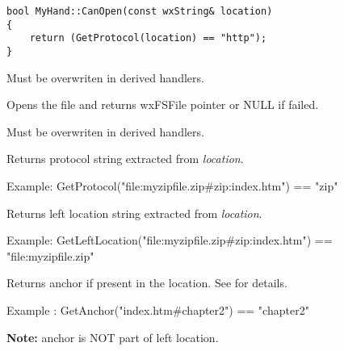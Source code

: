 \begin{verbatim}
bool MyHand::CanOpen(const wxString& location) 
{
    return (GetProtocol(location) == "http");
}
\end{verbatim}

Must be overwriten in derived handlers.

\label{wxfilesystemhandleropenfile}


Opens the file and returns wxFSFile pointer or NULL if failed.

Must be overwriten in derived handlers.




\label{wxfilesystemhandlergetprotocol}


Returns protocol string extracted from {\it location}. 

Example: GetProtocol("file:myzipfile.zip\#zip:index.htm") == "zip"

\label{wxfilesystemhandlergetleftlocation}


Returns left location string extracted from {\it location}. 

Example: GetLeftLocation("file:myzipfile.zip\#zip:index.htm") == "file:myzipfile.zip"

\label{wxfilesystemhandlergetanchor}


Returns anchor if present in the location.
See  for details.

Example : GetAnchor("index.htm\#chapter2") == "chapter2"

{\bf Note:} anchor is NOT part of left location.

\label{wxfilesystemhandlergetrightlocation}


